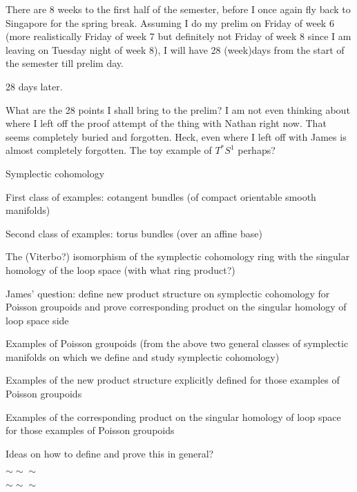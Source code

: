 \documentclass[hidelinks, 12pt]{article}
\theoremstyle{mydefstyle}
\theoremstyle{mythmstyle}
\begin{document}
There are 8 weeks to the first half of the semester, before I once again fly back to Singapore for the spring break. Assuming I do my prelim on Friday of week 6 (more realistically Friday of week 7 but definitely not Friday of week 8 since I am leaving on Tuesday night of week 8), I will have 28 (week)days from the start of the semester till prelim day. 

28 days later.

What are the 28 points I shall bring to the prelim? I am not even thinking about where I left off the proof attempt of the thing with Nathan right now. That seems completely buried and forgotten. Heck, even where I left off with James is almost completely forgotten. The toy example of $T^*S^1$ perhaps? 

Symplectic cohomology

First class of examples: cotangent bundles (of compact orientable smooth manifolds)

Second class of examples: torus bundles (over an affine base)

The (Viterbo?) isomorphism of the symplectic cohomology ring with the singular homology of the loop space (with what ring product?)

James' question: define new product structure on symplectic cohomology for Poisson groupoids and prove corresponding product on the singular homology of loop space side

Examples of Poisson groupoids (from the above two general classes of symplectic manifolds on which we define and study symplectic cohomology)

Examples of the new product structure explicitly defined for those examples of Poisson groupoids

Examples of the corresponding product on the singular homology of loop space for those examples of Poisson groupoids

Ideas on how to define and prove this in general? 

\begin{center}
$\sim \sim \sim$
\end{center}



\begin{center}
$\sim \sim \sim$
\end{center}
\end{document}
